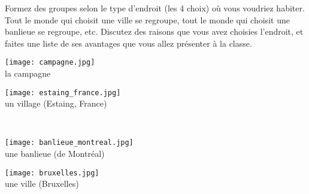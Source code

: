 \begin{frame}{}
  \scriptsize
  Formez des groupes selon le type d'endroit (les 4 choix) où vous voudriez habiter.
  Tout le monde qui choisit une ville se regroupe, tout le monde qui choisit une banlieue se regroupe, etc.
  Discutez des raisons que vous avez choisies l'endroit, et faites une liste de ses avantages que vous allez présenter à la classe.
  \begin{center}
  \parbox{0.49\linewidth}{
    \texttt{[image: campagne.jpg]} \\
    la campagne
  }
  \parbox{0.49\linewidth}{
    \texttt{[image: estaing\_france.jpg]} \\
    un village (Estaing, France)
  } \\
  \parbox{0.49\linewidth}{
    \texttt{[image: banlieue\_montreal.jpg]} \\
    une banlieue (de Montréal)
  }
  \parbox{0.49\linewidth}{
    \texttt{[image: bruxelles.jpg]} \\
    une ville (Bruxelles)
  }
  \end{center}
\end{frame}